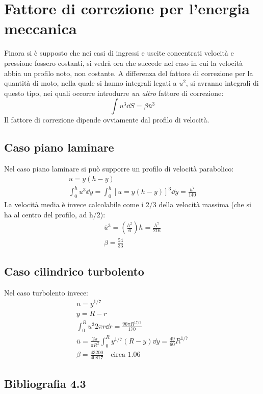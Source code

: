 %
 \section{Fattore di correzione per l'energia meccanica}
Finora si è supposto che nei casi di ingressi e uscite concentrati velocità e pressione fossero costanti, si vedrà ora che succede nel caso in cui la velocità abbia un profilo noto, non costante.
A differenza del fattore di correzione per la quantità di moto, nella quale si hanno integrali legati a $u^2$, si avranno integrali di questo tipo, nei quali occorre introdurre \textit{un altro} fattore di correzione:
%
	\begin{equation*}
		 \int u^3 \dd{S} = \beta {\bar{u}}^3
	\end{equation*}
%
Il fattore di correzione dipende ovviamente dal profilo di velocità.

\subsection{Caso piano laminare}
Nel caso piano laminare si può supporre un profilo di velocità parabolico:
%
	\begin{equation*}
		\begin{gathered}
			u = y (h-y)\\
			\int_0^h u^3 \dd{y} = \int_0^h {\left[ u = y (h-y) \right]}^3 \dd{y}= \frac{h^7}{140}
		\end{gathered}
	\end{equation*}
%			
La velocità media è invece calcolabile come i 2/3 della velocità massima (che si ha al centro del profilo, ad h/2):
%
	\begin{equation*}
		\begin{gathered}			
			{\bar{u}}^3 = \left( \frac{h^2}{6} \right) h = \frac{h^7}{216}\\
			\beta = \frac{54}{33}
		\end{gathered}
	\end{equation*}
%

\subsection{Caso cilindrico turbolento}
Nel caso turbolento invece:
%
	\begin{equation*}
		\begin{gathered}
			u = y^{1/7}\\
			y = R - r\\
			\int_0^R u^3 2 \pi r \dd{r} = \frac{96 \pi R^{17/7}}{170}\\
			\bar{u} = \frac{2 \pi}{\pi R^2} \int_0^R y^{1/7} (R-y) \dd{y} = \frac{49}{60} R^{1/7}\\
			\beta = \frac{43200}{40817} \quad \text{circa 1.06}
		\end{gathered}
	\end{equation*}
%

\subsection*{Bibliografia 4.3}
\cite[Cap.\ 5.4]{CengelCimbala}\\
\cite[Cap.\ 7.4]{PnueliGutfinger}